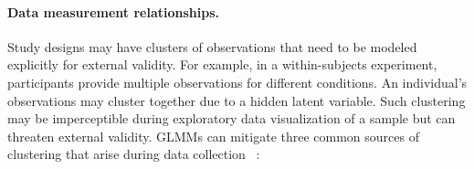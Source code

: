 

\paragraph{Data measurement relationships.}\label{sec:data-measurement-relationships}

Study designs may have clusters of observations that need to be modeled explicitly for external validity.
For example, in a within-subjects experiment, participants provide multiple
observations for different conditions. An individual's observations may cluster
together due to a hidden latent variable. Such clustering may be imperceptible
during exploratory data visualization of a sample but can threaten external validity.
GLMMs can mitigate three common sources of clustering that
arise during data collection
~\cite{gelmanHill2006regression,kreft1998introducing,cohen1988statistical}:

